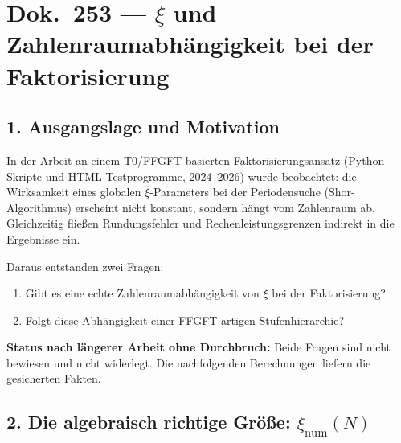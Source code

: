 \section*{Dok.\ 253 — \texorpdfstring{$\xi$}{xi} und Zahlenraumabhängigkeit bei der Faktorisierung}

\begin{abstract}
Arbeitsdokument. Zweck: Sicherung der Ergebnisse einer längeren Untersuchung
ohne Durchbruch. Untersucht wurde die Frage, ob der FFGFT-Parameter
$\xi = 4/30000$ bei der Faktorisierung zusammengesetzter Zahlen eine
Zahlenraumabhängigkeit zeigt und ob diese einer FFGFT-Stufenhierarchie folgt.
Alle Berechnungen wurden mit Python verifiziert. Die Verbindung zu FFGFT bleibt
Vermutung ohne algebraischen Brückenbeweis.
\end{abstract}

\subsection*{1. Ausgangslage und Motivation}

In der Arbeit an einem T0/FFGFT-basierten Faktorisierungsansatz (Python-Skripte
und HTML-Testprogramme, 2024--2026) wurde beobachtet: die Wirksamkeit eines
globalen $\xi$-Parameters bei der Periodensuche (Shor-Algorithmus) erscheint
nicht konstant, sondern hängt vom Zahlenraum ab. Gleichzeitig fließen
Rundungsfehler und Rechenleistungsgrenzen indirekt in die Ergebnisse ein.

Daraus entstanden zwei Fragen:

\begin{enumerate}
\item Gibt es eine echte Zahlenraumabhängigkeit von $\xi$ bei der Faktorisierung?
\item Folgt diese Abhängigkeit einer FFGFT-artigen Stufenhierarchie?
\end{enumerate}

\begin{mdframed}[style=warn]
\textbf{Status nach längerer Arbeit ohne Durchbruch:} Beide Fragen sind nicht
bewiesen und nicht widerlegt. Die nachfolgenden Berechnungen liefern die
gesicherten Fakten.
\end{mdframed}

\subsection*{2. Die algebraisch richtige Größe: $\xi_\text{num}(N)$}

